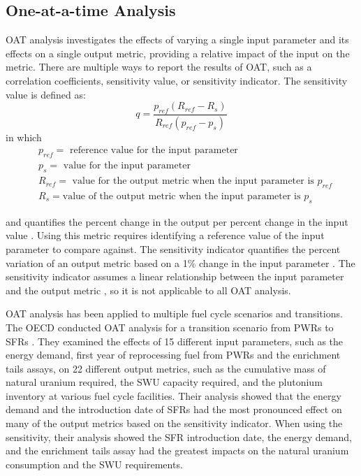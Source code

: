 \subsection{One-at-a-time Analysis}
\gls{OAT} analysis 
investigates the effects of varying a single input parameter and its effects
on a single output metric, providing a relative impact of the input on the 
metric. There are multiple ways to report the results of \gls{OAT}, such as a 
correlation coefficients, sensitivity value, or sensitivity indicator. 
The sensitivity value is defined as:
\begin{equation}
    q = \frac{p_{ref}(R_{ref}-R_s)}{R_{ref}(p_{ref}-p_s)}
    \label{eq:sensitivity_metric}
\end{equation}
in which 
\begin{align*}
    &p_{ref} = \text{ reference value for the input parameter}\\
    &p_s = \text{ value for the input parameter}\\
    &R_{ref} = \text{ value for the output metric when the input parameter is }p_{ref}\\
    &R_s = \text{value of the output metric when the input parameter is }p_s
\end{align*}

\noindent and quantifies the percent change in the output 
per percent change in the input value \cite{noauthor_effects_2017}. 
Using this metric requires identifying a reference value of the input 
parameter to compare against.
The sensitivity indicator  
quantifies the percent variation of an output metric based on a 1\% change in 
the input parameter \cite{noauthor_effects_2017}. The sensitivity indicator 
assumes a linear relationship between the input parameter and the output metric 
\cite{noauthor_effects_2017}, so it is not applicable to all \gls{OAT} 
analysis. 

\gls{OAT} analysis has been applied to multiple fuel cycle scenarios and 
transitions. The \gls{OECD} conducted \gls{OAT} analysis for a transition scenario 
from \glspl{PWR} to \glspl{SFR} \cite{noauthor_effects_2017}. They examined 
the effects of 15 different 
input parameters, such as the energy demand, first year of reprocessing fuel 
from \glspl{PWR} and the enrichment tails assays, on 22 different output metrics, 
such as the cumulative mass of natural uranium required, the \gls{SWU} capacity 
required, and the plutonium inventory at various fuel cycle facilities. 
Their analysis showed that the energy demand and the introduction date of 
\glspl{SFR} had the most pronounced effect on many of the output metrics 
based on the 
sensitivity indicator. When using the sensitivity, their analysis 
showed the \gls{SFR} introduction date, the energy demand, and the enrichment 
tails assay had the greatest impacts on the natural uranium consumption and 
the \gls{SWU} requirements. 

